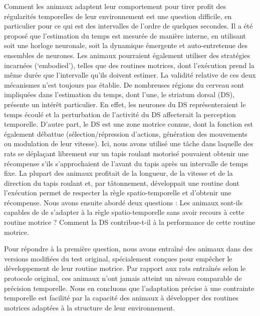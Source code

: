 Comment les animaux adaptent leur comportement pour tirer profit des régularités temporelles de leur environnement est une question difficile, en particulier pour ce qui est des intervalles de l'ordre de quelques secondes.
Il a été proposé que l'estimation du temps est mesurée de manière interne, en utilisant soit une horloge neuronale, soit la dynamique émergente et auto-entretenue des ensembles de neurones.
Les animaux pourraient également utiliser des stratégies incarnées (`embodied'), telles que des routines motrices, dont l'exécution prend la même durée que l'intervalle qu'ils doivent estimer.
La validité relative de ces deux mécanismes n'est toujours pas établie.
De nombreuses régions du cerveau sont impliquées dans l'estimation du temps, dont l'une, le striatum dorsal (DS), présente un intérêt particulier.
En effet, les neurones du DS représenteraient le temps écoulé et la perturbation de l'activité du DS affecterait la perception temporelle.
D'autre part, le DS est une zone motrice connue, dont la fonction est également débattue (sélection/répression d'actions, génération des mouvements ou modulation de leur vitesse).
Ici, nous avons utilisé une tâche dans laquelle des rats se déplaçant librement sur un tapis roulant motorisé pouvaient obtenir une récompense s'ils s'approchaient de l'avant du tapis après un intervalle de temps fixe.
La plupart des animaux profitait de la longueur, de la vitesse et de la direction du tapis roulant et, par tâtonnement, développait une routine dont l'exécution permet de respecter la règle spatio-temporelle et d'obtenir une récompense.
Nous avons ensuite abordé deux questions :
    Les animaux sont-ils capables de de s'adapter à la règle spatio-temporelle sans avoir recours à cette routine motrice ?
    Comment la DS contribue-t-il à la performance de cette routine motrice.

\par

Pour répondre à la première question, nous avons entraîné des animaux dans des versions modifiées du test original, spécialement conçues pour empêcher le développement de leur routine motrice.
Par rapport aux rats entraînés selon le protocole original, ces animaux n'ont jamais atteint un niveau comparable de précision temporelle.
Nous en concluons que l'adaptation précise à une contrainte temporelle est facilité par la capacité des animaux à développer des routines motrices adaptées à la structure de leur environnement.

\par

